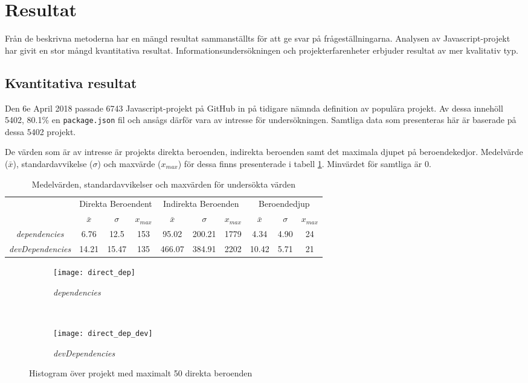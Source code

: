 \section{Resultat}
\label{sec:joel_o-results}
Från de beskrivna metoderna har en mängd resultat sammanställts för att ge svar på frågeställningarna. Analysen av Javascript-projekt har givit en stor mångd kvantitativa resultat. Informationsundersökningen och projekterfarenheter erbjuder resultat av mer kvalitativ typ.

\subsection{Kvantitativa resultat}
Den 6e April 2018 passade 6743 Javascript-projekt på GitHub in på tidigare nämnda definition av populära projekt. Av dessa innehöll 5402, 80.1\% en \texttt{package.json} fil och ansågs därför vara av intresse för undersökningen. Samtliga data som presenteras här är baserade på dessa 5402 projekt.

De värden som är av intresse är projekts direkta beroenden, indirekta beroenden samt det maximala djupet på beroendekedjor.
Medelvärde ($\bar{x}$), standardavvikelse ($\sigma$) och maxvärde ($x_{max}$) för dessa finns presenterade i tabell \ref{tab:beroende-data}. Minvärdet för samtliga är 0.

\begin{table}
  \centering
  \begin{tabular}{c | c c c | c c c | c c c |}
    \cline{2-10}
    & \multicolumn{3}{c|}{Direkta Beroendent} & \multicolumn{3}{c|}{Indirekta Beroenden} & \multicolumn{3}{c|}{Beroendedjup} \\ \cline{2-10}
    & $\bar{x}$ & $\sigma$ & $x_{max}$ & $\bar{x}$ & $\sigma$ & $x_{max}$ & $\bar{x}$ & $\sigma$ & $x_{max}$ \\ \hline
    \multicolumn{1}{|c|}{\textit{dependencies}} & 6.76 & 12.5 & 153 & 95.02 & 200.21 & 1779 & 4.34 & 4.90 & 24 \\ \hline
    \multicolumn{1}{|c|}{\textit{devDependencies}} & 14.21 & 15.47 & 135 & 466.07 & 384.91 & 2202 & 10.42 & 5.71 & 21 \\
    \hline
  \end{tabular}
  \caption{Medelvärden, standardavvikelser och maxvärden för undersökta värden}
  \label{tab:beroende-data}
\end{table}

\begin{figure*}[]
    \centering
    \begin{subfigure}[]{0.5\textwidth}
        \centering
        \texttt{[image: direct\_dep]}
        \caption{\textit{dependencies}}
    \end{subfigure}%
    ~
    \begin{subfigure}[]{0.5\textwidth}
        \centering
        \texttt{[image: direct\_dep\_dev]}
        \caption{\textit{devDependencies}}
    \end{subfigure}
    \caption{Histogram över projekt med maximalt 50 direkta beroenden}
    \label{fig:direct-dep}
\end{figure*}

